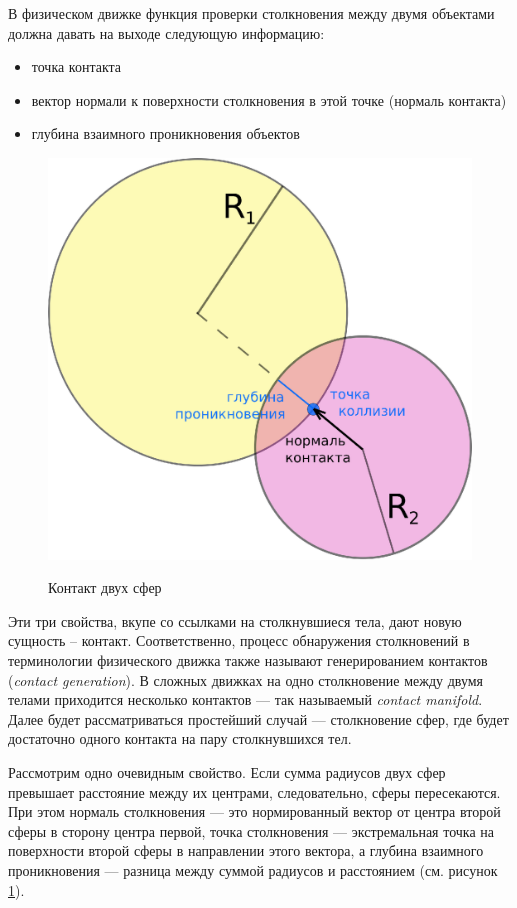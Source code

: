 В физическом движке функция проверки столкновения между двумя объектами должна давать на выходе следующую
информацию:
\begin{itemize}
  \item точка контакта
  \item вектор нормали к поверхности столкновения в этой точке (нормаль контакта)
  \item глубина взаимного проникновения объектов
\end{itemize}
\begin{figure}[ht!]
\begin{center}
\includegraphics[scale=0.45]{./Geometry/SphereCollision.eps}  \\
\caption{Контакт двух сфер}\label{SphereCollision}
\end{center}
\end{figure}
Эти три свойства, вкупе со ссылками на столкнувшиеся тела, дают новую сущность – контакт. Соответственно,
процесс обнаружения столкновений в терминологии физического движка также называют генерированием
контактов (\textit{contact generation}). В сложных движках на одно столкновение между двумя телами приходится несколько
контактов --- так называемый \textit{contact manifold}. Далее будет рассматриваться простейший случай --- столкновение сфер, где будет
достаточно одного контакта на пару столкнувшихся тел.

Рассмотрим одно очевидным свойство. Если сумма радиусов двух сфер превышает расстояние между их центрами, следовательно, сферы пересекаются.
При этом нормаль столкновения --- это нормированный вектор от центра второй сферы в сторону центра первой,
точка столкновения --- экстремальная точка на поверхности второй сферы в направлении этого вектора, а глубина взаимного
проникновения --- разница между суммой радиусов и расстоянием (см. рисунок \ref{SphereCollision}). %

